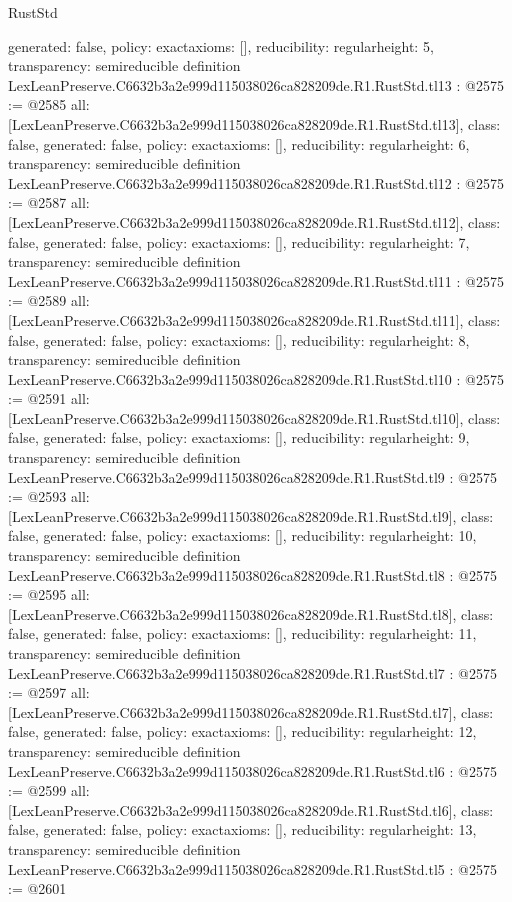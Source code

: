 \begin{lexlean}{RustStd}
\begin{coremodule}
{  generated: false,
  policy: exact{axioms: []},
  reducibility: regular{height: 5},
  transparency: semireducible
}
definition LexLeanPreserve.C6632b3a2e999d115038026ca828209de.R1.RustStd.tl13 : @2575 := @2585 {
  all: [LexLeanPreserve.C6632b3a2e999d115038026ca828209de.R1.RustStd.tl13],
  class: false,
  generated: false,
  policy: exact{axioms: []},
  reducibility: regular{height: 6},
  transparency: semireducible
}
definition LexLeanPreserve.C6632b3a2e999d115038026ca828209de.R1.RustStd.tl12 : @2575 := @2587 {
  all: [LexLeanPreserve.C6632b3a2e999d115038026ca828209de.R1.RustStd.tl12],
  class: false,
  generated: false,
  policy: exact{axioms: []},
  reducibility: regular{height: 7},
  transparency: semireducible
}
definition LexLeanPreserve.C6632b3a2e999d115038026ca828209de.R1.RustStd.tl11 : @2575 := @2589 {
  all: [LexLeanPreserve.C6632b3a2e999d115038026ca828209de.R1.RustStd.tl11],
  class: false,
  generated: false,
  policy: exact{axioms: []},
  reducibility: regular{height: 8},
  transparency: semireducible
}
definition LexLeanPreserve.C6632b3a2e999d115038026ca828209de.R1.RustStd.tl10 : @2575 := @2591 {
  all: [LexLeanPreserve.C6632b3a2e999d115038026ca828209de.R1.RustStd.tl10],
  class: false,
  generated: false,
  policy: exact{axioms: []},
  reducibility: regular{height: 9},
  transparency: semireducible
}
definition LexLeanPreserve.C6632b3a2e999d115038026ca828209de.R1.RustStd.tl9 : @2575 := @2593 {
  all: [LexLeanPreserve.C6632b3a2e999d115038026ca828209de.R1.RustStd.tl9],
  class: false,
  generated: false,
  policy: exact{axioms: []},
  reducibility: regular{height: 10},
  transparency: semireducible
}
definition LexLeanPreserve.C6632b3a2e999d115038026ca828209de.R1.RustStd.tl8 : @2575 := @2595 {
  all: [LexLeanPreserve.C6632b3a2e999d115038026ca828209de.R1.RustStd.tl8],
  class: false,
  generated: false,
  policy: exact{axioms: []},
  reducibility: regular{height: 11},
  transparency: semireducible
}
definition LexLeanPreserve.C6632b3a2e999d115038026ca828209de.R1.RustStd.tl7 : @2575 := @2597 {
  all: [LexLeanPreserve.C6632b3a2e999d115038026ca828209de.R1.RustStd.tl7],
  class: false,
  generated: false,
  policy: exact{axioms: []},
  reducibility: regular{height: 12},
  transparency: semireducible
}
definition LexLeanPreserve.C6632b3a2e999d115038026ca828209de.R1.RustStd.tl6 : @2575 := @2599 {
  all: [LexLeanPreserve.C6632b3a2e999d115038026ca828209de.R1.RustStd.tl6],
  class: false,
  generated: false,
  policy: exact{axioms: []},
  reducibility: regular{height: 13},
  transparency: semireducible
}
definition LexLeanPreserve.C6632b3a2e999d115038026ca828209de.R1.RustStd.tl5 : @2575 := @2601 {
}
\end{coremodule}
\end{lexlean}
